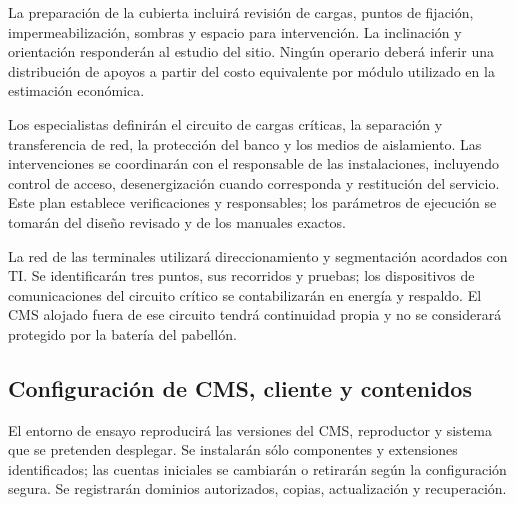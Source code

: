 La preparación de la cubierta incluirá revisión de cargas, puntos de fijación, impermeabilización, sombras y espacio para intervención. La inclinación y orientación responderán al estudio del sitio. Ningún operario deberá inferir una distribución de apoyos a partir del costo equivalente por módulo utilizado en la estimación económica.

Los especialistas definirán el circuito de cargas críticas, la separación y transferencia de red, la protección del banco y los medios de aislamiento. Las intervenciones se coordinarán con el responsable de las instalaciones, incluyendo control de acceso, desenergización cuando corresponda y restitución del servicio. Este plan establece verificaciones y responsables; los parámetros de ejecución se tomarán del diseño revisado y de los manuales exactos.


La red de las terminales utilizará direccionamiento y segmentación acordados con TI. Se identificarán tres puntos, sus recorridos y pruebas; los dispositivos de comunicaciones del circuito crítico se contabilizarán en energía y respaldo. El CMS alojado fuera de ese circuito tendrá continuidad propia y no se considerará protegido por la batería del pabellón.

\subsection{Configuración de CMS, cliente y contenidos}
El entorno de ensayo reproducirá las versiones del CMS, reproductor y sistema que se pretenden desplegar. Se instalarán sólo componentes y extensiones identificados; las cuentas iniciales se cambiarán o retirarán según la configuración segura. Se registrarán dominios autorizados, copias, actualización y recuperación.

